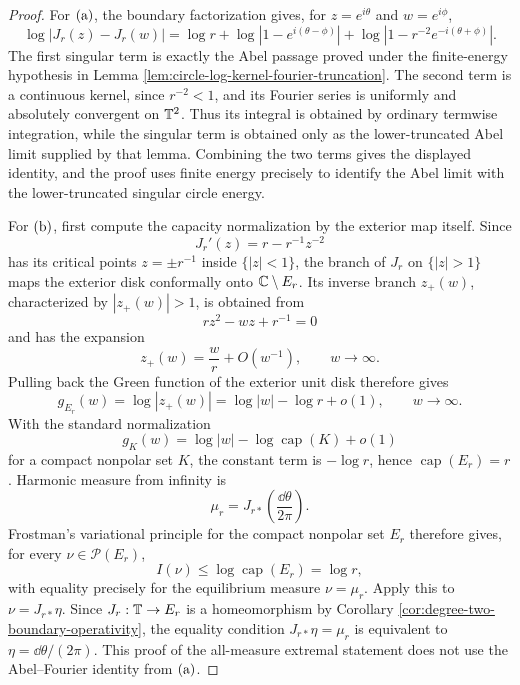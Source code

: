\begin{proof}
For \(\textup{(a)}\), the boundary factorization gives, for
\(z=e^{i\theta}\) and \(w=e^{i\phi}\),
\[
\log|J_r(z)-J_r(w)|
=\log r+\log|1-e^{i(\theta-\phi)}|
 +\log|1-r^{-2}e^{-i(\theta+\phi)}|.
\]
The first singular term is exactly the Abel passage proved under the
finite-energy hypothesis in Lemma
\ref{lem:circle-log-kernel-fourier-truncation}.  The second term is a
continuous kernel, since \(r^{-2}<1\), and its Fourier series is uniformly
and absolutely convergent on \(\mathbb{T}^2\).  Thus its integral is obtained by
ordinary termwise integration, while the singular term is obtained only as
the lower-truncated Abel limit supplied by that lemma.  Combining the two
terms gives the displayed identity, and the proof uses finite energy
precisely to identify the Abel limit with the lower-truncated singular
circle energy.

For \(\textup{(b)}\), first compute the capacity normalization by the
exterior map itself.  Since
\[
J_r'(z)=r-r^{-1}z^{-2}
\]
has its critical points \(z=\pm r^{-1}\) inside \(\{|z|<1\}\), the branch
of \(J_r\) on \(\{|z|>1\}\) maps the exterior disk conformally onto
\(\mathbb{C}\setminus E_r\).  Its inverse branch \(z_+(w)\), characterized by
\(|z_+(w)|>1\), is obtained from
\[
r z^2-wz+r^{-1}=0
\]
and has the expansion
\[
z_+(w)=\frac{w}{r}+O(w^{-1}),\qquad w\to\infty .
\]
Pulling back the Green function of the exterior unit disk therefore gives
\[
g_{E_r}(w)=\log|z_+(w)|
=\log|w|-\log r+o(1),\qquad w\to\infty .
\]
With the standard normalization
\[
g_K(w)=\log|w|-\log\operatorname{cap}(K)+o(1)
\]
for a compact nonpolar set \(K\), the constant term is \(-\log r\), hence
\(\operatorname{cap}(E_r)=r\).  Harmonic measure from infinity is
\[
\mu_r=J_{r\ast}\!\left(\frac{\dd\theta}{2\pi}\right).
\]
Frostman's variational principle for the compact nonpolar set \(E_r\)
therefore gives, for every \(\nu\in\mathcal P(E_r)\),
\[
I(\nu)\le\log\operatorname{cap}(E_r)=\log r,
\]
with equality precisely for the equilibrium measure \(\nu=\mu_r\).  Apply
this to \(\nu=J_{r\ast}\eta\).  Since \(J_r:\mathbb{T}\to E_r\) is a homeomorphism
by Corollary \ref{cor:degree-two-boundary-operativity}, the equality
condition \(J_{r\ast}\eta=\mu_r\) is equivalent to
\(\eta=\dd\theta/(2\pi)\).  This proof of the all-measure extremal
statement does not use the Abel--Fourier identity from \(\textup{(a)}\).
\end{proof}

